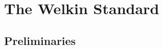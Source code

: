 

\chapter{The Welkin Standard}


\section{Preliminaries}

\newcommand*{\chars}{\mathrm{CHAR}}
\newcommand*{\numbers}{\mathrm{NUMBER}}
\newcommand*{\whitespaces}{\mathrm{WHITE\_SPACES}}
\newcommand*{\reserved}{\mathrm{RESERVED}}
\newcommand*{\strings}{\mathrm{STRING}}
\newcommand*{\term}{\mathrm{term}}
\newcommand*{\terms}{\mathrm{terms}}
\newcommand*{\delimiters}{\mathrm{DELIMITERS}}
\newcommand*{\encoding}{\mathcal{E}}
\newcommand*{\decoding}{\mathcal{D}}

\newcommand*{\scope}{\textrm{scope}}

